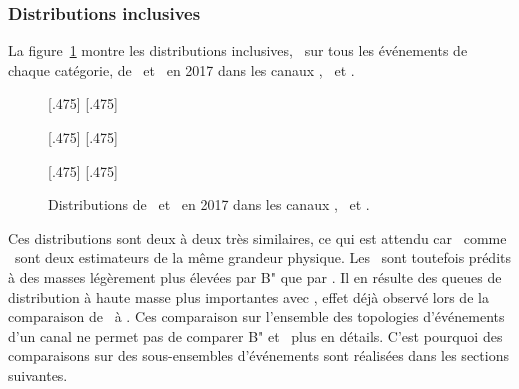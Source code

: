 \subsubsection{Distributions inclusives}
La figure~\ref{fig-svfit_vs_ml_2017}
montre les distributions inclusives, \ie\ sur tous les événements de chaque catégorie, de \msv\ et \mml\ en 2017 dans les canaux \tauh\tauh, \ele\tauh\ et \ele\mu.
\begin{figure}[p]
\centering

[.475\textwidth]
{}
\hfill
{}[.475\textwidth]
{}

[.475\textwidth]
{}
\hfill
{}[.475\textwidth]
{}

[.475\textwidth]
{}
\hfill
{}[.475\textwidth]
{}

\caption{Distributions de \msv\ et \mml\ en 2017 dans les canaux \tauh\tauh, \ele\tauh\ et \ele\mu.}
\label{fig-svfit_vs_ml_2017}
\end{figure}
Ces distributions sont deux à deux très similaires,
ce qui est attendu car \msv\ comme \mml\ sont deux estimateurs de la même grandeur physique.
Les \ftauhs\ sont toutefois prédits à des masses légèrement plus élevées par B" que par \SVFIT.
Il en résulte des queues de distribution à haute masse plus importantes avec \mml,
effet déjà observé lors de la comparaison de \mml\ à \mTtot.
Ces comparaison sur l'ensemble des topologies d'événements d'un canal ne permet pas de comparer B" et \SVFIT\ plus en détails.
C'est pourquoi des comparaisons sur des sous-ensembles d'événements sont réalisées dans les sections suivantes.
